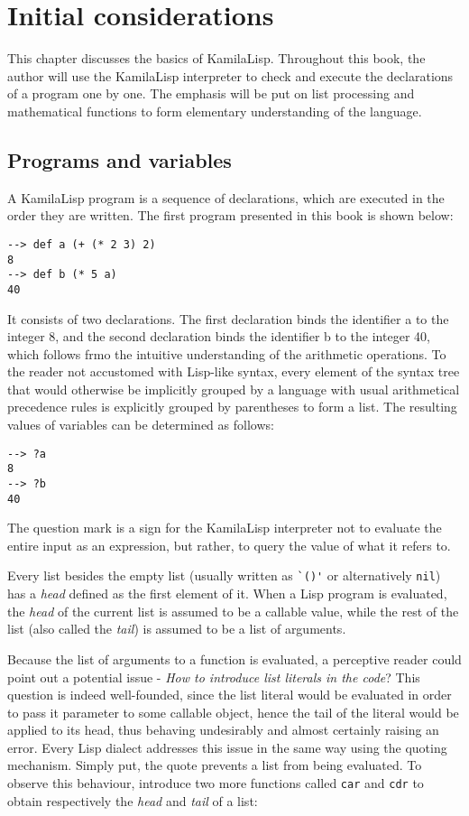 
\chapter{Initial considerations}

This chapter discusses the basics of KamilaLisp. Throughout this book, the author will use the KamilaLisp interpreter to check and execute the declarations of a program one by one. The emphasis will be put on list processing and mathematical functions to form elementary understanding of the language.

\section{Programs and variables}

A KamilaLisp program is a sequence of declarations, which are executed in the order they are written. The first program presented in this book is shown below:

\begin{verbatim}
--> def a (+ (* 2 3) 2)
8
--> def b (* 5 a)
40
\end{verbatim}

It consists of two declarations. The first declaration binds the identifier a to the integer 8, and the second declaration binds the identifier b to the integer 40, which follows frmo the intuitive understanding of the arithmetic operations. To the reader not accustomed with Lisp-like syntax, every element of the syntax tree that would otherwise be implicitly grouped by a language with usual arithmetical precedence rules is explicitly grouped by parentheses to form a list. The resulting values of variables can be determined as follows:

\begin{verbatim}
--> ?a
8
--> ?b
40
\end{verbatim}

The question mark is a sign for the KamilaLisp interpreter not to evaluate the entire input as an expression, but rather, to query the value of what it refers to.

Every list besides the empty list (usually written as \verb|`()'| or alternatively \verb|nil|) has a \textit{head} defined as the first element of it. When a Lisp program is evaluated, the \textit{head} of the current list is assumed to be a callable value, while the rest of the list (also called the \textit{tail}) is assumed to be a list of arguments.

Because the list of arguments to a function is evaluated, a perceptive reader could point out a potential issue - \textit{How to introduce list literals in the code}? This question is indeed well-founded, since the list literal would be evaluated in order to pass it parameter to some callable object, hence the tail of the literal would be applied to its head, thus behaving undesirably and almost certainly raising an error. Every Lisp dialect addresses this issue in the same way using the quoting mechanism. Simply put, the quote prevents a list from being evaluated. To observe this behaviour, introduce two more functions called \verb|car| and \verb|cdr| to obtain respectively the \textit{head} and \textit{tail} of a list:


